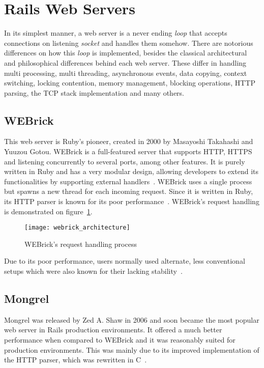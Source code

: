 \section{Rails Web Servers} %
\label{tech:sec:rails_webservers}
In its simplest manner, a web server is a never ending \textit{loop} that accepts connections on listening \textit{socket} and handles them somehow. There are notorious differences on how this \textit{loop} is implemented, besides the classical architectural and philosophical differences behind each web server. These differ in handling multi processing, multi threading, asynchronous events, data copying, context switching, locking contention, memory management, blocking operations, HTTP parsing, the TCP stack implementation and many others.


\subsection{WEBrick}
This web server is Ruby's pioneer, created in 2000 by Masayoshi Takahashi and Yuuzou Gotou. WEBrick is a full-featured server that supports HTTP, HTTPS and listening concurrently to several ports, among other features. It is purely written in Ruby and has a very modular design, allowing developers to extend its functionalities by supporting external handlers~\cite{webrick_guide}.
WEBrick uses a single process but spawns a new thread for each incoming request. Since it is written in Ruby, its HTTP parser is known for its poor performance~\cite{ruby_webservers}. WEBrick's request handling is demonstrated on figure~\ref{fig:webrick_architecture}.
\begin{figure}[h]
  \centering
    \texttt{[image: webrick\_architecture]}
  \caption{WEBrick's request handling process}
  \label{fig:webrick_architecture}
\end{figure}
Due to its poor performance, users normally used alternate, less conventional setups which were also known for their lacking stability~\cite{ruby_webservers}.


\subsection{Mongrel}
Mongrel was released by Zed A. Shaw in 2006 and soon became the most popular web server in Rails production environments. It offered a much better performance when compared to WEBrick and it was reasonably suited for production environments. This was mainly due to its improved implementation of the HTTP parser, which was rewritten in C~\cite{mongrel_server_production}.

